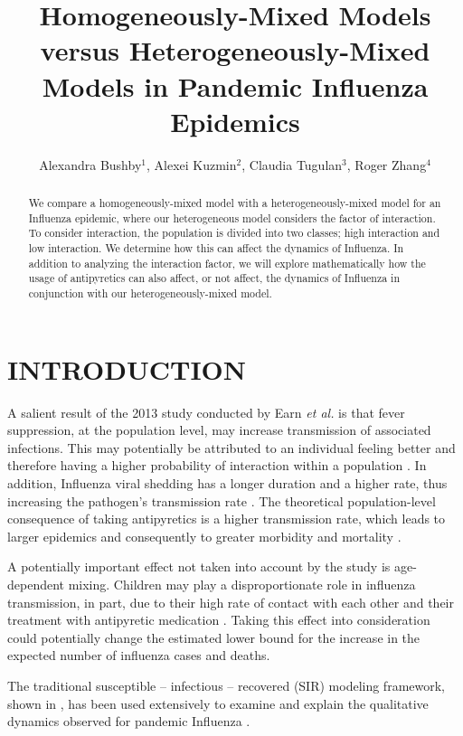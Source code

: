 \documentclass[a4paper, 12pt, journal]{ieeeconf}\usepackage[]{graphicx}\usepackage[]{color}
\title{\LARGE \bf
Homogeneously-Mixed Models versus Heterogeneously-Mixed Models in Pandemic Influenza Epidemics
}
\author{Alexandra Bushby$^{1}$, Alexei Kuzmin$^{2}$, Claudia Tugulan$^{3}$, Roger Zhang$^{4}$%
}
\begin{document}
\maketitle
\thispagestyle{empty}
\pagestyle{empty}

\begin{abstract}
We compare a homogeneously-mixed model with a heterogeneously-mixed model for an Influenza epidemic, where our heterogeneous model considers the factor of interaction. To consider interaction, the population is divided into two classes; high interaction and low interaction. We determine how this can affect the dynamics of Influenza. In addition to analyzing the interaction factor, we will explore mathematically how the usage of antipyretics can also affect, or not affect, the dynamics of Influenza in conjunction with our heterogeneously-mixed model.
\end{abstract}
\section{INTRODUCTION}
A salient result of the 2013 study conducted by Earn \textit{et al.} \cite{Earn_fever} is that fever suppression, at the population level, may increase transmission of associated infections.  This may potentially be attributed to an individual feeling better and therefore having a higher probability of interaction within a population \cite{Earn_fever}. In addition, Influenza viral shedding has a longer duration and a higher rate, thus increasing the pathogen's transmission rate \cite{ferret_study}. The theoretical population-level consequence of taking antipyretics is a higher transmission rate, which leads to larger epidemics and consequently to greater morbidity and mortality \cite{Kermack700,Ma2006,Earn_fever}.

A potentially important effect not taken into account by the study is age-dependent mixing. Children may play a disproportionate role in influenza transmission, in part, due to their high rate of contact with each other and their treatment with antipyretic medication \cite{antipyretic_treatment_children}.
Taking this effect into consideration could potentially change the estimated lower bound for the increase in the expected number of influenza cases and deaths. 

The traditional susceptible – infectious – recovered (SIR) modeling framework, shown in , has been used extensively to examine and explain the qualitative dynamics observed for pandemic Influenza \cite{IDhumans:dynamics&control}.
\end{document}

